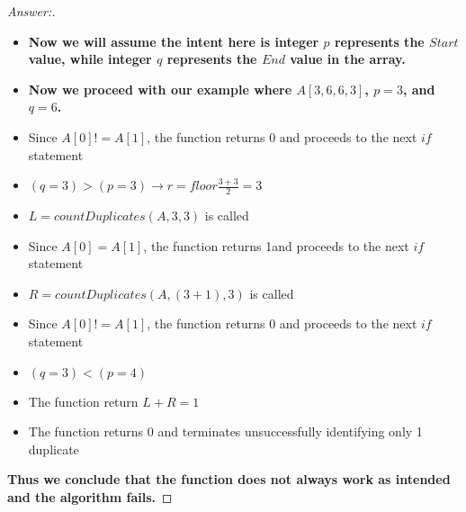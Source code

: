 \documentclass[11pt]{article}
\theoremstyle{definition}
\theoremstyle{definition}
\theoremstyle{definition}
\begin{document}
\begin{proof}[Answer:]
\begin{itemize}
\item \textbf{Now we will assume the intent here is integer $p$ represents the $Start$ value, while integer $q$ represents the $End$ value in the array.}
\item \textbf{Now we proceed with our example where $A[3, 6, 6, 3]$, $p = 3$, and $q = 6$.}
\item Since $A[0] != A[1]$, the function returns 0 and proceeds to the next $if$ statement
\item $(q = 3) > (p = 3) \to r = floor \frac{3 + 3}{2} = 3$
\item $L = countDuplicates (A, 3, 3)$ is called
\item Since $A[0] = A[1]$, the function returns 1and proceeds to the next $if$ statement
\item $R = countDuplicates (A, (3+1), 3)$ is called
\item Since $A[0] != A[1]$, the function returns 0 and proceeds to the next $if$ statement
\item $(q = 3) < (p = 4)$
\item The function return $L+R = 1$ 
\item The function returns 0 and terminates unsuccessfully identifying only 1 duplicate \\
\end{itemize}
\item \textbf{Thus we conclude that the function does not always work as intended and \color{red} the algorithm fails.}

\end{proof}




\end{document}
